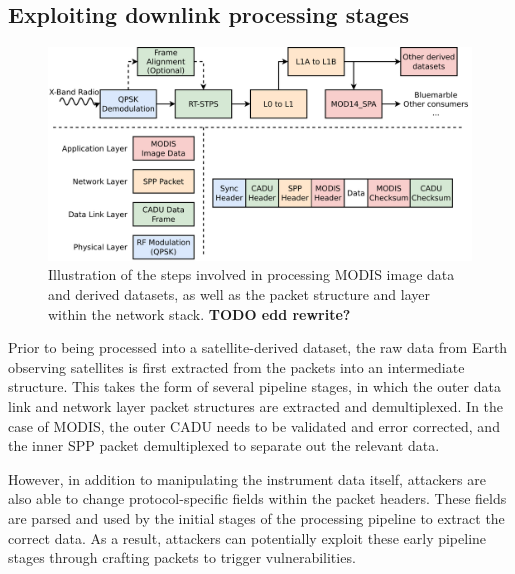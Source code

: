 


\subsection{Exploiting downlink processing stages}

\begin{figure}
    \centering
    \includegraphics[width=\linewidth]{diagrams/attack_types.pdf}
    \caption{Illustration of the steps involved in processing MODIS image data and derived datasets, as well as the packet structure and layer within the network stack. \textbf{TODO edd rewrite?}}
    \label{fig:attack_types}
\end{figure}



Prior to being processed into a satellite-derived dataset, the raw data from Earth observing satellites is first extracted from the packets into an intermediate structure.
This takes the form of several pipeline stages, in which the outer data link and network layer packet structures are extracted and demultiplexed.
In the case of MODIS, the outer CADU needs to be validated and error corrected, and the inner SPP packet demultiplexed to separate out the relevant data.

However, in addition to manipulating the instrument data itself, attackers are also able to change protocol-specific fields within the packet headers.
These fields are parsed and used by the initial stages of the processing pipeline to extract the correct data.
As a result, attackers can potentially exploit these early pipeline stages through crafting packets to trigger vulnerabilities.

